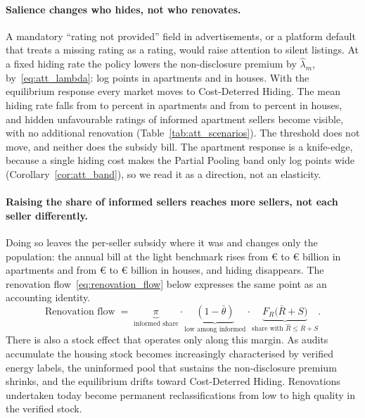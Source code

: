 \documentclass[10pt,letterpaper]{bp-template-concise}
\begin{document}
\paragraph{Salience changes who hides, not who renovates.}
A mandatory ``rating not provided'' field in advertisements, or a platform default that treats a missing rating as a rating, would raise attention to silent listings. At a fixed hiding rate the policy lowers the non-disclosure premium by $\hat\lambda_m$, by~\eqref{eq:att_lambda}: \attSalienceApt{} log points in apartments and \attSalienceHouse{} in houses. With the equilibrium response every market moves to Cost-Deterred Hiding. The mean hiding rate falls from \attSigmaObsApt{} to \attSigmaFullApt{} percent in apartments and from \attSigmaObsHouse{} to \attSigmaFullHouse{} percent in houses, and \attCfRevealedApt{} hidden unfavourable ratings of informed apartment sellers become visible, with no additional renovation (Table~\ref{tab:att_scenarios}). The threshold does not move, and neither does the subsidy bill. The apartment response is a knife-edge, because a single hiding cost makes the Partial Pooling band only \attBandWidthApt{} log points wide (Corollary~\ref{cor:att_band}), so we read it as a direction, not an elasticity.

\paragraph{Raising the share of informed sellers reaches more sellers, not each seller differently.}
Doing so leaves the per-seller subsidy where it was and changes only the population: the annual bill at the light benchmark rises from \euro{}\attScBaseCostTwoFiftyApt{} to \euro{}\attScPiOneCostTwoFiftyApt{} billion in apartments and from \euro{}\attScBaseCostTwoFiftyHouse{} to \euro{}\attScPiOneCostTwoFiftyHouse{} billion in houses, and hiding disappears. The renovation flow~\eqref{eq:renovation_flow} below expresses the same point as an accounting identity.
\begin{equation}
    \text{Renovation flow} \;=\; \underbrace{\pi}_{\text{informed share}} \cdot \underbrace{(1-\bar\theta)}_{\text{low among informed}} \cdot \underbrace{F_R\big(\bar R + S\big)}_{\text{share with }\hat R\le\bar R + S}.
    \label{eq:renovation_flow}
\end{equation}
There is also a stock effect that operates only along this margin. As audits accumulate the housing stock becomes increasingly characterised by verified energy labels, the uninformed pool that sustains the non-disclosure premium shrinks, and the equilibrium drifts toward Cost-Deterred Hiding. Renovations undertaken today become permanent reclassifications from low to high quality in the verified stock.
\end{document}
